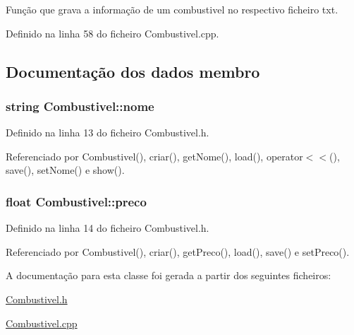 Função que grava a informação de um combustivel no respectivo ficheiro txt. 



Definido na linha 58 do ficheiro Combustivel.\+cpp.



\subsection{Documentação dos dados membro}
\hypertarget{class_combustivel_adfa329c4c4b60abcb87c1f3c82be4145}{
\subsubsection[{nome}]{\setlength{\rightskip}{0pt plus 5cm}string Combustivel\+::nome\hspace{0.3cm}{\ttfamily [private]}}}\label{class_combustivel_adfa329c4c4b60abcb87c1f3c82be4145}


Definido na linha 13 do ficheiro Combustivel.\+h.



Referenciado por Combustivel(), criar(), get\+Nome(), load(), operator$<$$<$(), save(), set\+Nome() e show().

\hypertarget{class_combustivel_ac910a8410930ba553861f584da9f48d1}{
\subsubsection[{preco}]{\setlength{\rightskip}{0pt plus 5cm}float Combustivel\+::preco\hspace{0.3cm}{\ttfamily [private]}}}\label{class_combustivel_ac910a8410930ba553861f584da9f48d1}


Definido na linha 14 do ficheiro Combustivel.\+h.



Referenciado por Combustivel(), criar(), get\+Preco(), load(), save() e set\+Preco().



A documentação para esta classe foi gerada a partir dos seguintes ficheiros\+:\begin{DoxyCompactItemize}
\item 
\hyperlink{_combustivel_8h}{Combustivel.\+h}\item 
\hyperlink{_combustivel_8cpp}{Combustivel.\+cpp}\end{DoxyCompactItemize}
